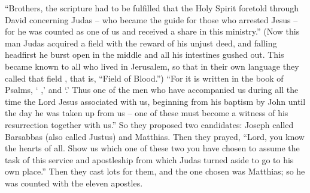 {“Brothers,
the scripture
had to be
fulfilled
that the Holy
Spirit
foretold
through
David
concerning
Judas
– who became
the guide
for those who arrested
Jesus –
for
he was
counted
as one of us
and
received
a share
in this
ministry.”
(Now this man
Judas acquired
a field
with
the reward
of his unjust deed,
and
falling
headfirst
he burst open
in the middle
and
all
his
intestines
gushed out.
This became
known
to all
who lived
in Jerusalem,
so that
in their own
language
they called
that
field
{}, that
is,
“Field
of Blood.”)
“For
it is written
in
the book
of Psalms, ‘{}
{},’
 and ‘{}.’
Thus
one of the men
who have accompanied
us
during
all
the time
the Lord
Jesus
associated
with
us,
beginning
from
his baptism
by John
until
the day
he was taken up
from
us
– one
of these
must become
a witness
of
his
resurrection
together with
us.”
So
they proposed
two
candidates: Joseph
called
Barsabbas
(also called
Justus) and
Matthias.
Then
they prayed, “Lord,
you
know the hearts
of all.
Show
us which
one
of
these
two
you have chosen
to assume
the task
of this
service
and
apostleship
from
which
Judas
turned aside
to go
to
his own
place.”
Then
they cast
lots
for them,
and
the one chosen
was Matthias;
so
he was counted
with
the eleven
apostles.

}
